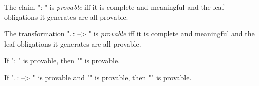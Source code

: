 \documentclass[a4paper]{easychair}
\begin{document}
\begin{defn}
\label{defn:proc-provable} \mbox{}
\begin{ecom}
  \item The claim "\pi : " is \emph{provable} iff it is
    complete and meaningful and the leaf obligations it generates are
    all provable.
  \item The transformation "\sigma.\,\tau :  --> " is \emph{provable} iff it is complete and meaningful and
    the leaf obligations it generates are all provable.
  \end{ecom}
\end{defn}

\begin{thm}[Correctness] \label{thm:correctness} \mbox{}
\begin{ecom}[\LSP (1)]
  \item If "\pi : " is provable, then ""
    is provable.
  \item If "\sigma.\,\tau :  --> " is
    provable and "" is provable, then "" is provable.
  \end{ecom}
\end{thm}
\end{document}
